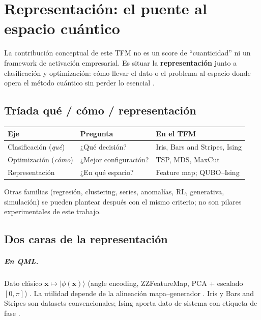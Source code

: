 \chapter{Representación: el puente al espacio cuántico}
\label{cap:investigacion_original}

La contribución conceptual de este TFM no es un score de ``cuanticidad'' ni un framework de activación empresarial. Es situar la \textbf{representación} junto a clasificación y optimización: cómo llevar el dato o el problema al espacio donde opera el método cuántico sin perder lo esencial \citep{lloyd2020, pennylaneEmbedBlog, parzygnat2025}.

\section{Tríada qué / cómo / representación}

\begin{center}
\renewcommand{\arraystretch}{1.2}
\begin{tabular}{@{}lll@{}}
\toprule
\textbf{Eje} & \textbf{Pregunta} & \textbf{En el TFM} \\
\midrule
Clasificación (\emph{qué}) & ¿Qué decisión? & Iris, Bars and Stripes, Ising \\
Optimización (\emph{cómo}) & ¿Mejor configuración? & TSP, MDS, MaxCut \\
Representación & ¿En qué espacio? & Feature map; QUBO--Ising \\
\bottomrule
\end{tabular}
\end{center}

\vspace{0.5em}
Otras familias (regresión, clustering, series, anomalías, RL, generativa, simulación) se pueden plantear después con el mismo criterio; no son pilares experimentales de este trabajo.

\section{Dos caras de la representación}

\paragraph{En QML.}
Dato clásico $\mathbf{x}\mapsto\lvert\phi(\mathbf{x})\rangle$ (angle encoding, ZZFeatureMap, PCA + escalado $[0,\pi]$) \citep{pennylaneGlossaryEmbedding, pennylaneVariationalClassifier}. La utilidad depende de la alineación mapa--generador \citep{huang2021, bowles2024}. Iris y Bars and Stripes son datasets convencionales; Ising aporta dato de sistema con etiqueta de fase \citep{pennylaneWhatIsQuantumDataset, pennylaneConventionalDatasets, pennylaneIsing}.

